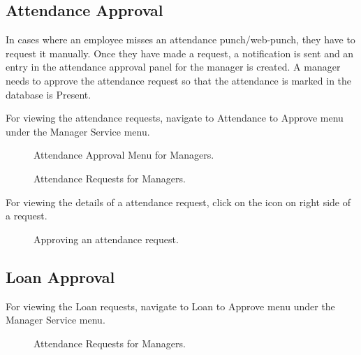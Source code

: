 \documentclass[letterpaper,10pt,english]{sphinxmanual}
\begin{document}
\subsection{Attendance Approval}
\label{\detokenize{manager/manager-approval:attendance-approval}}\label{\detokenize{manager/manager-approval:id1}}
In cases where an employee misses an attendance punch/web-punch, they have to request it manually. Once they have made a request, a notification is sent and an entry in the attendance approval panel for the manager is created. A manager needs to approve the attendance request so that the attendance is marked in the database is Present.

For viewing the attendance requests, navigate to Attendance to Approve menu under the Manager Service menu.

\begin{figure}[htbp]
\centering
\capstart

\noindent{}
\caption{Attendance Approval Menu for Managers.}\label{\detokenize{manager/manager-approval:id8}}\end{figure}

\begin{figure}[htbp]
\centering
\capstart

\noindent{}
\caption{Attendance Requests for Managers.}\label{\detokenize{manager/manager-approval:id9}}\end{figure}

For viewing the details of a attendance request, click on the \sphinxstyleemphasis{} icon on right side of a request.

\begin{figure}[htbp]
\centering
\capstart

\noindent{}
\caption{Approving an attendance request.}\label{\detokenize{manager/manager-approval:id10}}\end{figure}


\subsection{Loan Approval}
\label{\detokenize{manager/manager-approval:id2}}\label{\detokenize{manager/manager-approval:loan-approval}}
For viewing the Loan requests, navigate to Loan to Approve menu under the Manager Service menu.

\begin{figure}[htbp]
\centering
\capstart

\noindent{}
\caption{Attendance Requests for Managers.}\label{\detokenize{manager/manager-approval:id11}}\end{figure}
\end{document}
